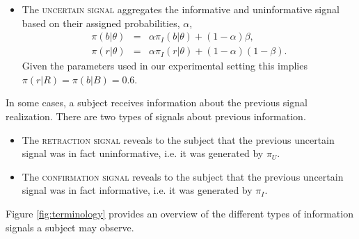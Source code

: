 \documentclass{article}
\begin{document}
\begin{itemize}

    \item The \textsc{uncertain signal} aggregates the informative and uninformative signal based on their assigned probabilities, $\alpha$,
    \begin{eqnarray*}
    \pi(b|\theta)&=&\alpha\pi_I(b|\theta)+(1-\alpha)\beta, \\
    \pi(r|\theta)&=&\alpha\pi_I(r|\theta)+(1-\alpha)(1-\beta). 
    \end{eqnarray*}
    Given the parameters used in our experimental setting this implies $\pi(r|R) = \pi(b|B) = 0.6$.
    
\end{itemize}

In some cases, a subject receives information about the previous signal realization. There are two types of signals about previous information.

\begin{itemize}
    
    \item The \textsc{retraction signal} reveals to the subject that the previous uncertain signal was in fact uninformative, i.e. it was generated by $\pi_U$.

    \item The \textsc{confirmation signal} reveals to the subject that the previous uncertain signal was in fact informative, i.e. it was generated by $\pi_I$.

\end{itemize}

Figure \ref{fig:terminology} provides an overview of the different types of information signals a subject may observe. 
\end{document}
